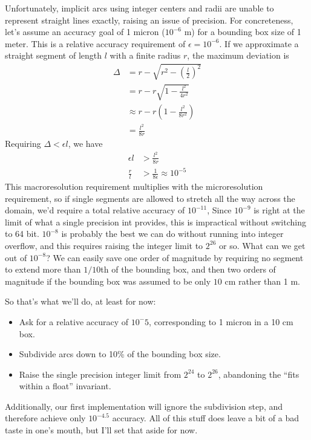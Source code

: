 \documentclass[11pt]{article}
\begin{document}
Unfortunately, implicit arcs using integer centers and radii are unable to represent straight lines exactly, raising an issue of precision.
For concreteness, let's assume an accuracy goal of 1 micron ($10^{-6}$ m) for a bounding box size of 1 meter.  This is a relative accuracy
requirement of $\epsilon = 10^{-6}$.  If we approximate a straight segment of length $l$ with a finite radius $r$, the maximum deviation is
\begin{align*}
\Delta &= r - \sqrt{r^2 - \left(\frac{l}{2}\right)^2} \\
       &= r - r \sqrt{1 - \frac{l^2}{4 r^2}} \\
       &\approx r - r \left(1 - \frac{l^2}{8 r^2} \right) \\
       &= \frac{l^2}{8 r}
\end{align*}
Requiring $\Delta < \epsilon l$, we have
\begin{align*}
\epsilon l &> \frac{l^2}{8 r} \\
\frac{r}{l} &> \frac{1}{8 \epsilon} \approx 10^{-5}
\end{align*}
This macroresolution requirement multiplies with the microresolution requirement, so if single segments are allowed to stretch all the way
across the domain, we'd require a total relative accuracy of $10^{-11}$,  Since $10^{-9}$ is right at the limit of what a single precision
int provides, this is impractical without switching to 64 bit.  $10^{-8}$ is probably the best we can do without running into integer overflow,
and this requires raising the integer limit to $2^{26}$ or so.  What can we get out of $10^{-8}$?  We can easily save one order of magnitude by
requiring no segment to extend more than $1/10$th of the bounding box, and then two orders of magnitude if the bounding box was assumed to be
only $10$ cm rather than 1 m.

So that's what we'll do, at least for now:
\begin{itemize}
\item Ask for a relative accuracy of $10^-5$, corresponding to 1 micron in a 10 cm box.
\item Subdivide arcs down to 10\% of the bounding box size.
\item Raise the single precision integer limit from $2^{24}$ to $2^{26}$, abandoning the ``fits within a float'' invariant.
\end{itemize}
Additionally, our first implementation will ignore the subdivision step, and therefore achieve only $10^{-4.5}$ accuracy.  All of this stuff
does leave a bit of a bad taste in one's mouth, but I'll set that aside for now.
\end{document}
